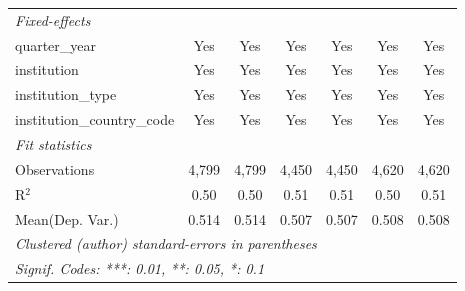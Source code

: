 \begin{tabular}{lcccccc}
   \midrule
   \emph{Fixed-effects}\\
   quarter\_year                      & Yes     & Yes     & Yes     & Yes     & Yes          & Yes\\  
   institution                        & Yes     & Yes     & Yes     & Yes     & Yes          & Yes\\  
   institution\_type                  & Yes     & Yes     & Yes     & Yes     & Yes          & Yes\\  
   institution\_country\_code         & Yes     & Yes     & Yes     & Yes     & Yes          & Yes\\  
   \midrule
   \emph{Fit statistics}\\
   Observations                       & 4,799   & 4,799   & 4,450   & 4,450   & 4,620        & 4,620\\  
   R$^2$                              & 0.50    & 0.50    & 0.51    & 0.51    & 0.50         & 0.51\\  
Mean(Dep. Var.) & 0.514 & 0.514 & 0.507 & 0.507 & 0.508 & 0.508 \\
   \midrule \midrule
   \multicolumn{7}{l}{\emph{Clustered (author) standard-errors in parentheses}}\\
   \multicolumn{7}{l}{\emph{Signif. Codes: ***: 0.01, **: 0.05, *: 0.1}}\\
\end{tabular}
\par\endgroup
